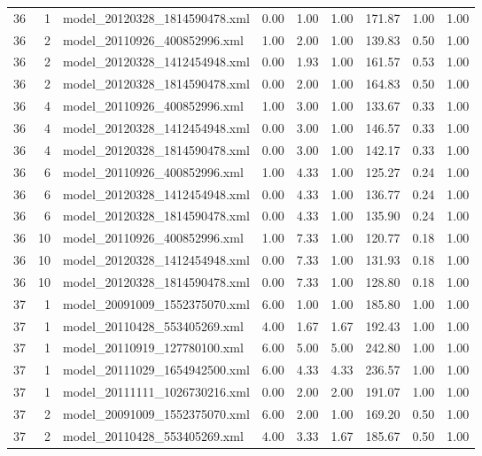 \begin{table}[ht]
\begin{tabular}{rrlrrrrrr}
   36 &   1 & model\_20120328\_1814590478.xml & 0.00 & 1.00 & 1.00 & 171.87 & 1.00 & 1.00 \\ 
   36 &   2 & model\_20110926\_400852996.xml & 1.00 & 2.00 & 1.00 & 139.83 & 0.50 & 1.00 \\ 
   36 &   2 & model\_20120328\_1412454948.xml & 0.00 & 1.93 & 1.00 & 161.57 & 0.53 & 1.00 \\ 
   36 &   2 & model\_20120328\_1814590478.xml & 0.00 & 2.00 & 1.00 & 164.83 & 0.50 & 1.00 \\ 
   36 &   4 & model\_20110926\_400852996.xml & 1.00 & 3.00 & 1.00 & 133.67 & 0.33 & 1.00 \\ 
   36 &   4 & model\_20120328\_1412454948.xml & 0.00 & 3.00 & 1.00 & 146.57 & 0.33 & 1.00 \\ 
   36 &   4 & model\_20120328\_1814590478.xml & 0.00 & 3.00 & 1.00 & 142.17 & 0.33 & 1.00 \\ 
   36 &   6 & model\_20110926\_400852996.xml & 1.00 & 4.33 & 1.00 & 125.27 & 0.24 & 1.00 \\ 
   36 &   6 & model\_20120328\_1412454948.xml & 0.00 & 4.33 & 1.00 & 136.77 & 0.24 & 1.00 \\ 
   36 &   6 & model\_20120328\_1814590478.xml & 0.00 & 4.33 & 1.00 & 135.90 & 0.24 & 1.00 \\ 
   36 &  10 & model\_20110926\_400852996.xml & 1.00 & 7.33 & 1.00 & 120.77 & 0.18 & 1.00 \\ 
   36 &  10 & model\_20120328\_1412454948.xml & 0.00 & 7.33 & 1.00 & 131.93 & 0.18 & 1.00 \\ 
   36 &  10 & model\_20120328\_1814590478.xml & 0.00 & 7.33 & 1.00 & 128.80 & 0.18 & 1.00 \\ 
   37 &   1 & model\_20091009\_1552375070.xml & 6.00 & 1.00 & 1.00 & 185.80 & 1.00 & 1.00 \\ 
   37 &   1 & model\_20110428\_553405269.xml & 4.00 & 1.67 & 1.67 & 192.43 & 1.00 & 1.00 \\ 
   37 &   1 & model\_20110919\_127780100.xml & 6.00 & 5.00 & 5.00 & 242.80 & 1.00 & 1.00 \\ 
   37 &   1 & model\_20111029\_1654942500.xml & 6.00 & 4.33 & 4.33 & 236.57 & 1.00 & 1.00 \\ 
   37 &   1 & model\_20111111\_1026730216.xml & 0.00 & 2.00 & 2.00 & 191.07 & 1.00 & 1.00 \\ 
   37 &   2 & model\_20091009\_1552375070.xml & 6.00 & 2.00 & 1.00 & 169.20 & 0.50 & 1.00 \\ 
   37 &   2 & model\_20110428\_553405269.xml & 4.00 & 3.33 & 1.67 & 185.67 & 0.50 & 1.00 \\ 

\end{tabular}
\end{table}
